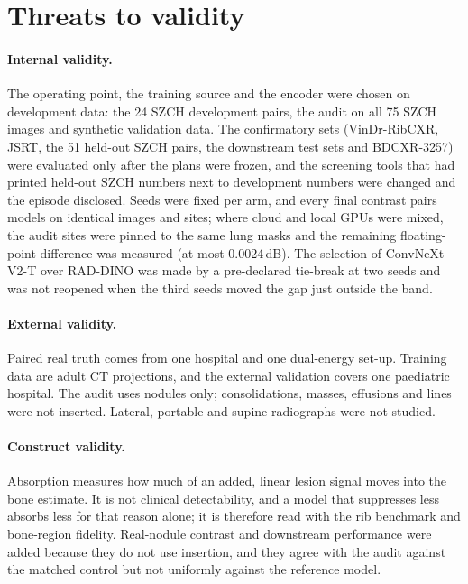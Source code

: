 



\section{Threats to validity}
\paragraph{Internal validity.} The operating point, the training source and the encoder were chosen on development data: the 24 SZCH
development pairs, the audit on all 75 SZCH images and synthetic validation data. The confirmatory sets (VinDr-RibCXR, JSRT, the 51 held-out
SZCH pairs, the downstream test sets and BDCXR-3257) were evaluated only after the plans were frozen, and the screening tools that had printed
held-out SZCH numbers next to development numbers were changed and the episode disclosed. Seeds were fixed per arm, and every final contrast
pairs models on identical images and sites; where cloud and local GPUs were mixed, the audit sites were pinned to the same lung masks and the
remaining floating-point difference was measured (at most 0.0024\,dB). The selection of ConvNeXt-V2-T over RAD-DINO was made by a pre-declared
tie-break at two seeds and was not reopened when the third seeds moved the gap just outside the band.

\paragraph{External validity.} Paired real truth comes from one hospital and one dual-energy set-up. Training data are adult CT projections,
and the external validation covers one paediatric hospital. The audit uses nodules only; consolidations, masses, effusions and lines were not
inserted. Lateral, portable and supine radiographs were not studied.

\paragraph{Construct validity.} Absorption measures how much of an added, linear lesion signal moves into the bone estimate. It is not
clinical detectability, and a model that suppresses less absorbs less for that reason alone; it is therefore read with the rib benchmark and
bone-region fidelity. Real-nodule contrast and downstream performance were added because they do not use insertion, and they agree with the
audit against the matched control but not uniformly against the reference model.

